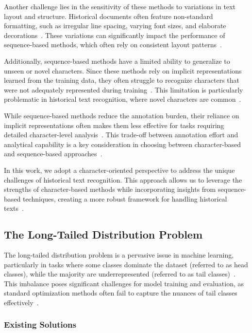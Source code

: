 Another challenge lies in the sensitivity of these methods to variations in text layout and structure. Historical documents often feature non-standard formatting, such as irregular line spacing, varying font sizes, and elaborate decorations~\cite{layoutvar}. These variations can significantly impact the performance of sequence-based methods, which often rely on consistent layout patterns~\cite{senslayout}.

Additionally, sequence-based methods have a limited ability to generalize to unseen or novel characters. Since these methods rely on implicit representations learned from the training data, they often struggle to recognize characters that were not adequately represented during training~\cite{novelty, generalization}. This limitation is particularly problematic in historical text recognition, where novel characters are common~\cite{hde}.

While sequence-based methods reduce the annotation burden, their reliance on implicit representations often makes them less effective for tasks requiring detailed character-level analysis~\cite{implicit}. This trade-off between annotation effort and analytical capability is a key consideration in choosing between character-based and sequence-based approaches~\cite{tradeoff}.

In this work, we adopt a character-oriented perspective to address the unique challenges of historical text recognition. This approach allows us to leverage the strengths of character-based methods while incorporating insights from sequence-based techniques, creating a more robust framework for handling historical texts~\cite{hybrid}.

\subsection{The Long-Tailed Distribution Problem}

The long-tailed distribution problem is a pervasive issue in machine learning, particularly in tasks where some classes dominate the dataset (referred to as head classes), while the majority are underrepresented (referred to as tail classes)~\cite{tailsurvey}. This imbalance poses significant challenges for model training and evaluation, as standard optimization methods often fail to capture the nuances of tail classes effectively~\cite{challenge}.

\subsubsection{Existing Solutions}

